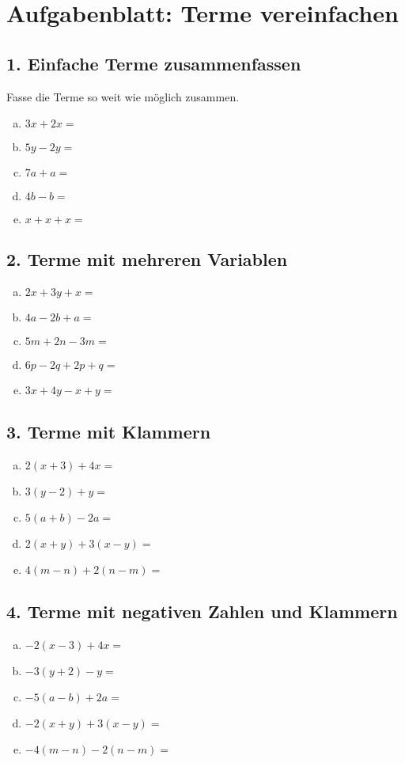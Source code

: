 
\section*{Aufgabenblatt: Terme vereinfachen}

\subsection*{1. Einfache Terme zusammenfassen}
Fasse die Terme so weit wie möglich zusammen.
\begin{enumerate}[a)]
    \item $3x + 2x =$
    \item $5y - 2y =$
    \item $7a + a =$
    \item $4b - b =$
    \item $x + x + x =$
\end{enumerate}

\subsection*{2. Terme mit mehreren Variablen}
\begin{enumerate}[a)]
    \item $2x + 3y + x =$
    \item $4a - 2b + a =$
    \item $5m + 2n - 3m =$
    \item $6p - 2q + 2p + q =$
    \item $3x + 4y - x + y =$
\end{enumerate}

\subsection*{3. Terme mit Klammern}
\begin{enumerate}[a)]
    \item $2(x + 3) + 4x =$
    \item $3(y - 2) + y =$
    \item $5(a + b) - 2a =$
    \item $2(x + y) + 3(x - y) =$
    \item $4(m - n) + 2(n - m) =$
\end{enumerate}

\subsection*{4. Terme mit negativen Zahlen und Klammern}
\begin{enumerate}[a)]
    \item $-2(x - 3) + 4x =$
    \item $-3(y + 2) - y =$
    \item $-5(a - b) + 2a =$
    \item $-2(x + y) + 3(x - y) =$
    \item $-4(m - n) - 2(n - m) =$
\end{enumerate}

